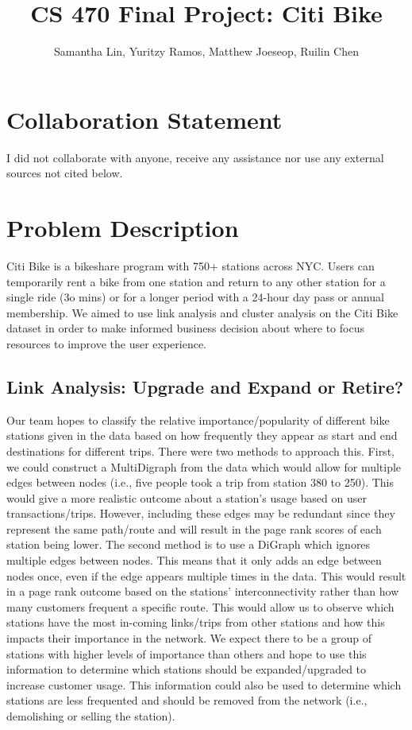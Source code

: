\documentclass{article}
\title{CS 470 Final Project: Citi Bike}
\author{Samantha Lin, Yuritzy Ramos, Matthew Joeseop, Ruilin Chen}
\begin{document}
\maketitle

\section{Collaboration Statement}
I did not collaborate with anyone, receive any assistance nor use any external sources not cited below.

\section{Problem Description}
Citi Bike is a bikeshare program with 750+ stations across NYC. Users can temporarily rent a bike from one station and return to any other station for a single ride (3o mins) or for a longer period with a 24-hour day pass or annual membership. We aimed to use link analysis and cluster analysis on the Citi Bike dataset in order to make informed business decision about where to focus resources to improve the user experience.

\subsection{Link Analysis: Upgrade and Expand or Retire?}
Our team hopes to classify the relative importance/popularity of different bike stations given in the data based on how frequently they appear as start and end destinations for different trips. There were two methods to approach this. First, we could construct a MultiDigraph from the data which would allow for multiple edges between nodes (i.e., five people took a trip from station 380 to 250). This would give a more realistic outcome about a station's usage based on user transactions/trips. However, including these edges may be redundant since they represent the same path/route and will result in the page rank scores of each station being lower. The second method is to use a DiGraph which ignores multiple edges between nodes. This means that it only adds an edge between nodes once, even if the edge appears multiple times in the data. This would result in a page rank outcome based on the stations’ interconnectivity rather than how many customers frequent a specific route. This would allow us to observe which stations have the most in-coming links/trips from other stations and how this impacts their importance in the network. We expect there to be a group of stations with higher levels of importance than others and hope to use this information to determine which stations should be expanded/upgraded to increase customer usage. This information could also be used to determine which stations are less frequented and should be removed from the network (i.e., demolishing or selling the station). 
\end{document}

